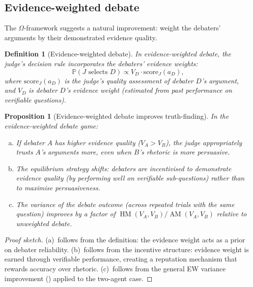 \documentclass[11pt,a4paper]{article}
\newtheorem{proposition}[theorem]{Proposition}
\newtheorem{definition}[theorem]{Definition}
\DeclareMathOperator{\AM}{AM}
\DeclareMathOperator{\HM}{HM}
\newcommand{\Prob}{\mathbb{P}}
\begin{document}
\subsection{Evidence-weighted debate}

The $\Omega$-framework suggests a natural improvement: weight the debaters' arguments by their demonstrated evidence quality.

\begin{definition}[Evidence-weighted debate]
\label{def:ew-debate}
In \emph{evidence-weighted debate}, the judge's decision rule incorporates the debaters' evidence weights:
\begin{equation}
    \Prob(J \text{ selects } D) \propto V_D \cdot \mathrm{score}_J(a_D),
\end{equation}
where $\mathrm{score}_J(a_D)$ is the judge's quality assessment of debater $D$'s argument, and $V_D$ is debater $D$'s evidence weight (estimated from past performance on verifiable questions).
\end{definition}

\begin{proposition}[Evidence-weighted debate improves truth-finding]
\label{prop:ew-debate}
In the evidence-weighted debate game:
\begin{enumerate}[(a)]
    \item If debater $A$ has higher evidence quality ($V_A > V_B$), the judge appropriately trusts $A$'s arguments more, even when $B$'s rhetoric is more persuasive.
    \item The equilibrium strategy shifts: debaters are incentivised to \emph{demonstrate evidence quality} (by performing well on verifiable sub-questions) rather than to \emph{maximise persuasiveness}.
    \item The variance of the debate outcome (across repeated trials with the same question) improves by a factor of $\HM(V_A, V_B) / \AM(V_A, V_B)$ relative to unweighted debate.
\end{enumerate}
\end{proposition}

\begin{proof}[Proof sketch]
(a)~follows from the definition: the evidence weight acts as a prior on debater reliability. (b)~follows from the incentive structure: evidence weight is earned through verifiable performance, creating a reputation mechanism that rewards accuracy over rhetoric. (c)~follows from the general EW variance improvement () applied to the two-agent case.
\end{proof}
\end{document}
